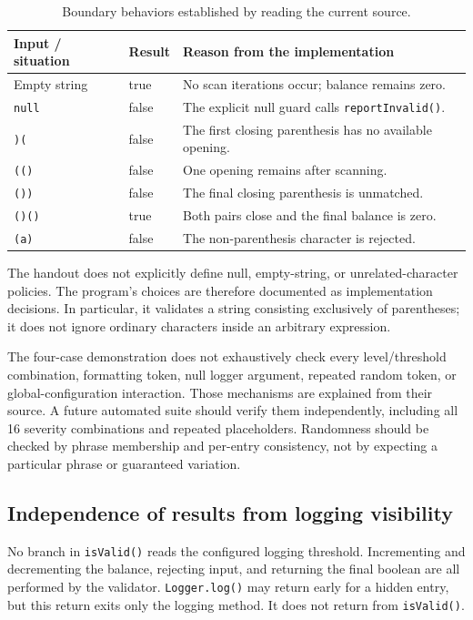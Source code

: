 \documentclass[12pt,a4paper]{article}
\newcommand{\code}[1]{\texttt{#1}}
\begin{document}
\begin{table}[H]
\centering\small
\begin{tabularx}{\textwidth}{@{}p{}p{}Y@{}}
\toprule
\textbf{Input / situation} & \textbf{Result} & \textbf{Reason from the implementation}\\
\midrule
Empty string & true & No scan iterations occur; balance remains zero.\\
\code{null} & false & The explicit null guard calls \code{reportInvalid()}.\\
\code{)(} & false & The first closing parenthesis has no available opening.\\
\code{(()} & false & One opening remains after scanning.\\
\code{())} & false & The final closing parenthesis is unmatched.\\
\code{()()} & true & Both pairs close and the final balance is zero.\\
\code{(a)} & false & The non-parenthesis character is rejected.\\
\bottomrule
\end{tabularx}
\caption{Boundary behaviors established by reading the current source.}
\end{table}

The handout does not explicitly define null, empty-string, or unrelated-character policies. The program's choices are therefore documented as implementation decisions. In particular, it validates a string consisting exclusively of parentheses; it does not ignore ordinary characters inside an arbitrary expression.

The four-case demonstration does not exhaustively check every level/threshold combination, formatting token, null logger argument, repeated random token, or global-configuration interaction. Those mechanisms are explained from their source. A future automated suite should verify them independently, including all 16 severity combinations and repeated placeholders. Randomness should be checked by phrase membership and per-entry consistency, not by expecting a particular phrase or guaranteed variation.

\subsection{Independence of results from logging visibility}
No branch in \code{isValid()} reads the configured logging threshold. Incrementing and decrementing the balance, rejecting input, and returning the final boolean are all performed by the validator. \code{Logger.log()} may return early for a hidden entry, but this return exits only the logging method. It does not return from \code{isValid()}.
\end{document}
